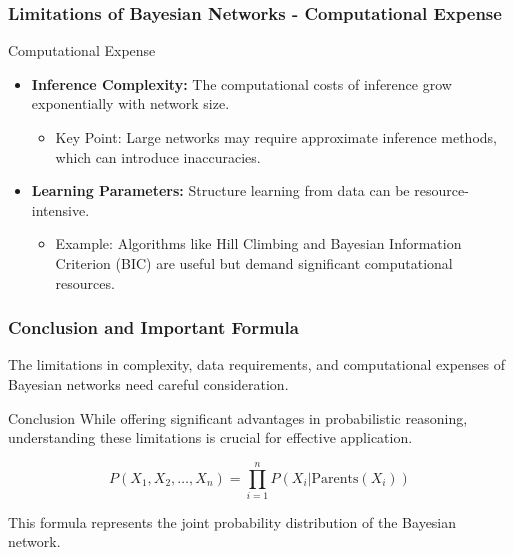 \documentclass[aspectratio=169]{beamer}
\begin{document}
\begin{frame}[fragile]
  \frametitle{Limitations of Bayesian Networks - Computational Expense}
  
  \begin{block}{Computational Expense}
    \begin{itemize}
      \item \textbf{Inference Complexity:} The computational costs of inference grow exponentially with network size.
        \begin{itemize}
          \item Key Point: Large networks may require approximate inference methods, which can introduce inaccuracies.
        \end{itemize}
      \item \textbf{Learning Parameters:} Structure learning from data can be resource-intensive.
        \begin{itemize}
          \item Example: Algorithms like Hill Climbing and Bayesian Information Criterion (BIC) are useful but demand significant computational resources.
        \end{itemize}
    \end{itemize}
  \end{block}
\end{frame}

\begin{frame}[fragile]
  \frametitle{Conclusion and Important Formula}
  
  The limitations in complexity, data requirements, and computational expenses of Bayesian networks need careful consideration. 

  \begin{block}{Conclusion}
    While offering significant advantages in probabilistic reasoning, understanding these limitations is crucial for effective application.
  \end{block}

  \begin{equation}
  P(X_1, X_2, \ldots, X_n) = \prod_{i=1}^{n} P(X_i | \text{Parents}(X_i))
  \end{equation}
  
  This formula represents the joint probability distribution of the Bayesian network.
\end{frame}
\end{document}
